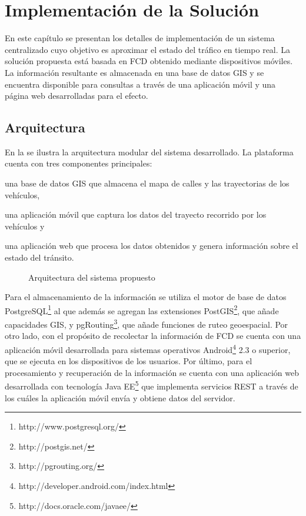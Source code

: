 \chapter{Implementación de la Solución}
\label{cap:6}

En este capítulo se presentan los detalles de implementación de un sistema centralizado cuyo objetivo es aproximar el estado del tráfico en tiempo real. La solución propuesta está basada en FCD obtenido mediante dispositivos móviles. La información resultante es almacenada en una base de datos GIS y se encuentra disponible para consultas a través de una aplicación móvil y una página web desarrolladas para el efecto.

\section{Arquitectura}

En la  se ilustra la arquitectura modular del sistema desarrollado. La plataforma cuenta con tres componentes principales:
\begin{enumerate*}[1)] \item una base de datos GIS que almacena el mapa de calles y las trayectorias de los vehículos, \item una aplicación móvil que captura los datos del trayecto recorrido por los vehículos y \item una aplicación web que procesa los datos obtenidos y genera información sobre el estado del tránsito.
\end{enumerate*}

\begin{figure}[h]
	\centering
	
	\caption{\label{fig:arquitectura} Arquitectura del sistema propuesto}	
\end{figure}

Para el almacenamiento de la información se utiliza el motor de base de datos PostgreSQL\footnote{http://www.postgresql.org/} al que además se agregan las extensiones PostGIS\footnote{http://postgis.net/}, que añade capacidades GIS, y pgRouting\footnote{http://pgrouting.org/}, que añade funciones de ruteo geoespacial. Por otro lado, con el propósito de recolectar la información de FCD se cuenta con una aplicación móvil desarrollada para sistemas operativos Android\footnote{http://developer.android.com/index.html} 2.3 o superior, que se ejecuta en los dispositivos de los usuarios. Por último, para el procesamiento y recuperación de la información se cuenta con una aplicación web desarrollada con tecnología Java EE\footnote{http://docs.oracle.com/javaee/} que implementa servicios REST a través de los cuáles la aplicación móvil envía y obtiene datos del servidor.

